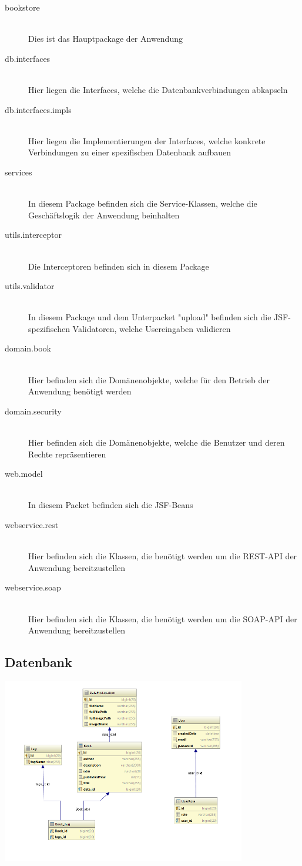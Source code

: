 \documentclass[12pt,a4paper]{book}
\begin{document}
		\begin{description}
			\item[bookstore] \hfill \\
			 Dies ist das Hauptpackage der Anwendung
			 	\item[db.interfaces] \hfill \\
				 	Hier liegen die Interfaces, welche die Datenbankverbindungen abkapseln
			 		\item[db.interfaces.impls] \hfill \\
			 		Hier liegen die Implementierungen der Interfaces, welche konkrete Verbindungen zu einer spezifischen Datenbank aufbauen
			 	\item[services] \hfill \\
			 	In diesem Package befinden sich die Service-Klassen, welche die Geschäftslogik der Anwendung beinhalten
		\item[utils.interceptor] \hfill \\
		Die Interceptoren befinden sich in diesem Package
		\item[utils.validator] \hfill \\
		In diesem Package und dem Unterpacket "upload" befinden sich die JSF-spezifischen Validatoren, welche Usereingaben validieren
		\item[domain.book] \hfill \\
		Hier befinden sich die Domänenobjekte, welche für den Betrieb der Anwendung benötigt werden 
		\item[domain.security] \hfill \\
		Hier befinden sich die Domänenobjekte, welche die Benutzer und deren Rechte repräsentieren
		\item[web.model] \hfill \\
		In diesem Packet befinden sich die JSF-Beans
		\item[webservice.rest] \hfill \\
		Hier befinden sich die Klassen, die benötigt werden um die REST-API der Anwendung bereitzustellen
		\item[webservice.soap] \hfill \\
		Hier befinden sich die Klassen, die benötigt werden um die SOAP-API der Anwendung bereitzustellen
		\end{description}
		
		\subsection{Datenbank}
			\begin{center}
				\includegraphics[width=0.8\textwidth]{Images/database.png}
				\label{fig2}
			\end{center}
		
			
		
		
\end{document}
